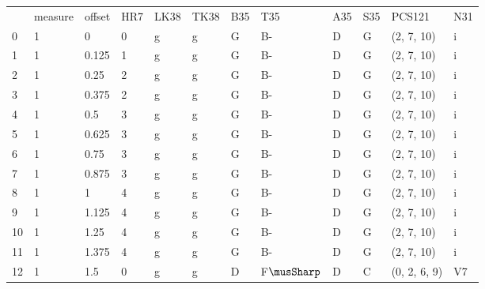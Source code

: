 \begin{tabular}{llllllllllll}
    & measure & offset & HR7 & LK38 & TK38 & B35 & T35 & A35 & S35 & PCS121 & N31 \\
0   & 1       & 0      & 0               & g          & g              & G      & B-      & D      & G         & (2, 7, 10)       & i              \\
1   & 1       & 0.125  & 1               & g          & g              & G      & B-      & D      & G         & (2, 7, 10)       & i              \\
2   & 1       & 0.25   & 2               & g          & g              & G      & B-      & D      & G         & (2, 7, 10)       & i              \\
3   & 1       & 0.375  & 2               & g          & g              & G      & B-      & D      & G         & (2, 7, 10)       & i              \\
4   & 1       & 0.5    & 3               & g          & g              & G      & B-      & D      & G         & (2, 7, 10)       & i              \\
5   & 1       & 0.625  & 3               & g          & g              & G      & B-      & D      & G         & (2, 7, 10)       & i              \\
6   & 1       & 0.75   & 3               & g          & g              & G      & B-      & D      & G         & (2, 7, 10)       & i              \\
7   & 1       & 0.875  & 3               & g          & g              & G      & B-      & D      & G         & (2, 7, 10)       & i              \\
8   & 1       & 1      & 4               & g          & g              & G      & B-      & D      & G         & (2, 7, 10)       & i              \\
9   & 1       & 1.125  & 4               & g          & g              & G      & B-      & D      & G         & (2, 7, 10)       & i              \\
10  & 1       & 1.25   & 4               & g          & g              & G      & B-      & D      & G         & (2, 7, 10)       & i              \\
11  & 1       & 1.375  & 4               & g          & g              & G      & B-      & D      & G         & (2, 7, 10)       & i              \\
12  & 1       & 1.5    & 0               & g          & g              & D      & F$\musSharp$      & D      & C         & (0, 2, 6, 9)     & V7             \\

\end{tabular}
